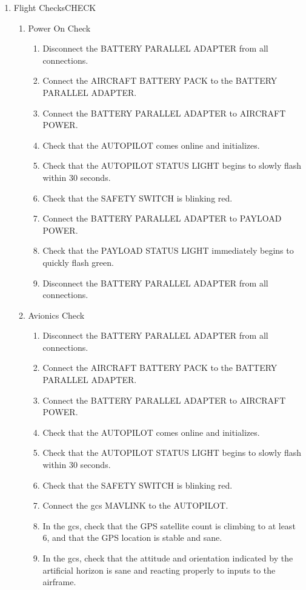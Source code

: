 \documentclass{report}
\begin{document}
\begin{enumerate}
\begin{itemize}
				\end{itemize}
			\item Flight Checks\hrulefill CHECK
				\begin{enumerate}
					\item Power On Check
						\begin{enumerate}
							\item Disconnect the BATTERY PARALLEL ADAPTER from all connections.
							\item Connect the AIRCRAFT BATTERY PACK to the BATTERY PARALLEL ADAPTER.
							\item Connect the BATTERY PARALLEL ADAPTER to AIRCRAFT POWER.
							\item Check that the AUTOPILOT comes online and initializes.
							\item Check that the AUTOPILOT STATUS LIGHT begins to slowly flash within 30 seconds.
							\item Check that the SAFETY SWITCH is blinking red.
							\item Connect the BATTERY PARALLEL ADAPTER to PAYLOAD POWER.
							\item Check that the PAYLOAD STATUS LIGHT immediately begins to quickly flash green.
							\item Disconnect the BATTERY PARALLEL ADAPTER from all connections.
						\end{enumerate}
					\item Avionics Check
						\begin{enumerate}
							\item Disconnect the BATTERY PARALLEL ADAPTER from all connections.
							\item Connect the AIRCRAFT BATTERY PACK to the BATTERY PARALLEL ADAPTER.
							\item Connect the BATTERY PARALLEL ADAPTER to AIRCRAFT POWER.
							\item Check that the AUTOPILOT comes online and initializes.
							\item Check that the AUTOPILOT STATUS LIGHT begins to slowly flash within 30 seconds.
							\item Check that the SAFETY SWITCH is blinking red.
							\item Connect the \gls{gcs} MAVLINK to the AUTOPILOT.
							\item In the \gls{gcs}, check that the GPS satellite count is climbing to at least 6, and that the GPS location is stable and sane.
							\item In the \gls{gcs}, check that the attitude and orientation indicated by the artificial horizon is sane and reacting properly to inputs to the airframe.

\end{enumerate}
\end{enumerate}
\end{enumerate}
\end{document}
